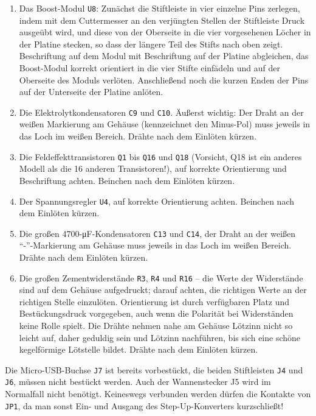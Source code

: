 \documentclass[paper=a4, open=any, numbers=noenddot]{scrbook}
\begin{document}
\begin{enumerate}
					\item Das Boost-Modul \texttt{U8}: Zunächst die Stiftleiste in vier einzelne Pins zerlegen, indem mit dem Cuttermesser an den verjüngten Stellen der Stiftleiste Druck ausgeübt wird, und diese von der Oberseite in die vier vorgesehenen Löcher in der Platine stecken, so dass der längere Teil des Stifts nach oben zeigt. Beschriftung auf dem Modul mit Beschriftung auf der Platine abgleichen, das Boost-Modul korrekt orientiert in die vier Stifte einfädeln und auf der Oberseite des Moduls verlöten. Anschließend noch die kurzen Enden der Pins auf der Unterseite der Platine anlöten.
					\item Die Elektrolytkondensatoren \texttt{C9} und \texttt{C10}. Äußerst wichtig: Der Draht an der weißen Markierung am Gehäuse (kennzeichnet den Minus-Pol) muss jeweils in das Loch im weißen Bereich. Drähte nach dem Einlöten kürzen.
					\item Die Feldeffekttransistoren \texttt{Q1} bis \texttt{Q16} und \texttt{Q18} (Vorsicht, Q18 ist ein anderes Modell als die 16 anderen Transistoren!), auf korrekte Orientierung und Beschriftung achten. Beinchen nach dem Einlöten kürzen.
					\item Der Spannungsregler \texttt{U4}, auf korrekte Orientierung achten. Beinchen nach dem Einlöten kürzen.
					\item Die großen 4700-\si{\micro\farad}-Kondensatoren \texttt{C13} und \texttt{C14}, der Draht an der weißen \enquote{-}-Markierung am Gehäuse muss jeweils in das Loch im weißen Bereich. Drähte nach dem Einlöten kürzen.
					\item Die großen Zementwiderstände \texttt{R3}, \texttt{R4} und \texttt{R16} -- die Werte der Widerstände sind auf dem Gehäuse aufgedruckt; darauf achten, die richtigen Werte an der richtigen Stelle einzulöten. Orientierung ist durch verfügbaren Platz und Bestückungsdruck vorgegeben, auch wenn die Polarität bei Widerständen keine Rolle spielt. Die Drähte nehmen nahe am Gehäuse Lötzinn nicht so leicht auf, daher geduldig sein und Lötzinn nachführen, bis sich eine schöne kegelförmige Lötstelle bildet. Drähte nach dem Einlöten kürzen.
				\end{enumerate}

				Die Micro-USB-Buchse \texttt{J7} ist bereits vorbestückt, die beiden Stiftleisten \texttt{J4} und \texttt{J6}, müssen nicht bestückt werden. Auch der Wannenstecker {J5} wird im Normalfall nicht benötigt. Keineswegs verbunden werden dürfen die Kontakte von \texttt{JP1}, da man sonst Ein- und Ausgang des Step-Up-Konverters kurzschließt!
\end{document}
